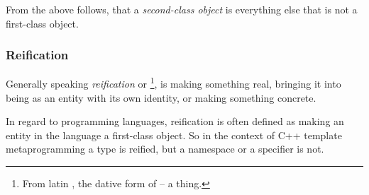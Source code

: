 From the above follows, that a {\em second-class object} is everything else that
is not a first-class object.

\subsubsection{Reification}
\label{term-reification}

Generally speaking {\em reification} or \footnote{From latin
, the dative form of  -- a thing.}, is making something
real, bringing it into being as an entity with its own identity,
or making something concrete.

In regard to programming languages, reification is often defined as making
an entity in the language a first-class object. So in the context of C++ template
metaprogramming a type is reified, but a namespace or a specifier is not.

